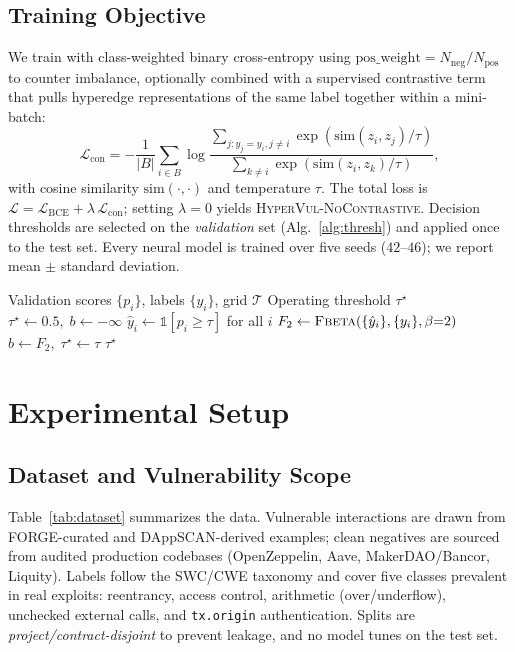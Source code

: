 \documentclass[conference]{IEEEtran}
\begin{document}
\subsection{Training Objective}
\label{sec:train}
We train with class-weighted binary cross-entropy using
$\text{pos\_weight} = N_{\text{neg}} / N_{\text{pos}}$ to counter imbalance,
optionally combined with a supervised contrastive term~\cite{oord2018infonce} that
pulls hyperedge representations of the same label together within a mini-batch:
\begin{equation}
\mathcal{L}_{\text{con}} = -\frac{1}{|B|}\!\sum_{i\in B}
   \log \frac{\sum_{j: y_j=y_i, j\neq i}\exp(\mathrm{sim}(z_i,z_j)/\tau)}
             {\sum_{k\neq i}\exp(\mathrm{sim}(z_i,z_k)/\tau)},
\label{eq:con}
\end{equation}
with cosine similarity $\mathrm{sim}(\cdot,\cdot)$ and temperature $\tau$. The total
loss is $\mathcal{L} = \mathcal{L}_{\text{BCE}} + \lambda\,\mathcal{L}_{\text{con}}$;
setting $\lambda=0$ yields \textsc{HyperVul-NoContrastive}. Decision thresholds are
selected on the \emph{validation} set (Alg.~\ref{alg:thresh}) and applied once to the
test set. Every neural model is trained over five seeds ($42$--$46$); we report mean
$\pm$ standard deviation.

\begin{algorithm}[t]
\caption{Validation threshold selection (max-F2)}
\label{alg:thresh}
\begin{algorithmic}[1]
\REQUIRE Validation scores $\{p_i\}$, labels $\{y_i\}$, grid $\mathcal{T}$
\ENSURE Operating threshold $\tau^\star$
\STATE $\tau^\star \leftarrow 0.5,\; b \leftarrow -\infty$
  \STATE $\hat{y}_i \leftarrow \mathbb{1}[p_i \geq \tau]$ for all $i$
  \STATE $F_2 \leftarrow \textsc{Fbeta}(\{\hat{y}_i\},\{y_i\}, \beta{=}2)$
     \STATE $b \leftarrow F_2,\; \tau^\star \leftarrow \tau$
  \ENDIF
\ENDFOR
\RETURN $\tau^\star$
\end{algorithmic}
\end{algorithm}

\section{Experimental Setup}
\label{sec:setup}

\subsection{Dataset and Vulnerability Scope}
Table~\ref{tab:dataset} summarizes the data. Vulnerable interactions are drawn from
FORGE-curated and DAppSCAN-derived examples; clean negatives are sourced from audited
production codebases (OpenZeppelin, Aave, MakerDAO/Bancor, Liquity). Labels follow the
SWC/CWE taxonomy and cover five classes prevalent in real exploits: reentrancy,
access control, arithmetic (over/underflow), unchecked external calls, and
\texttt{tx.origin} authentication. Splits are \emph{project/contract-disjoint} to
prevent leakage, and no model tunes on the test set.
\end{document}

